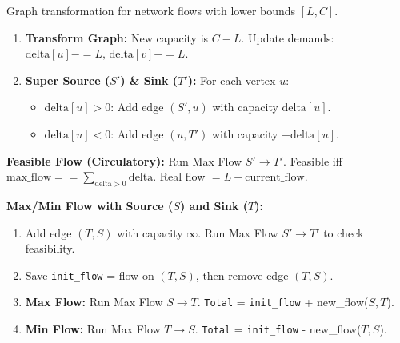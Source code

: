 
Graph transformation for network flows with lower bounds $[L, C]$.

\begin{enumerate}
    \item \textbf{Transform Graph:} New capacity is $C - L$. Update demands: $\text{delta}[u] -= L, \, \text{delta}[v] += L$.
    \item \textbf{Super Source ($S'$) \& Sink ($T'$):} For each vertex $u$:
    \begin{itemize}
        \item $\text{delta}[u] > 0$: Add edge $(S', u)$ with capacity $\text{delta}[u]$.
        \item $\text{delta}[u] < 0$: Add edge $(u, T')$ with capacity $-\text{delta}[u]$.
    \end{itemize}
\end{enumerate}

\textbf{Feasible Flow (Circulatory):} Run Max Flow $S' \to T'$. Feasible iff $\text{max\_flow} == \sum_{\text{delta} > 0} \text{delta}$. Real flow $= L + \text{current\_flow}$.

\textbf{Max/Min Flow with Source ($S$) and Sink ($T$):}
\begin{enumerate}
    \item Add edge $(T, S)$ with capacity $\infty$. Run Max Flow $S' \to T'$ to check feasibility.
    \item Save \lstinline|init_flow| = flow on $(T, S)$, then remove edge $(T, S)$.
    \item \textbf{Max Flow:} Run Max Flow $S \to T$. \lstinline|Total| = \lstinline|init_flow| + new\_flow($S, T$).
    \item \textbf{Min Flow:} Run Max Flow $T \to S$. \lstinline|Total| = \lstinline|init_flow| - new\_flow($T, S$).
\end{enumerate}
